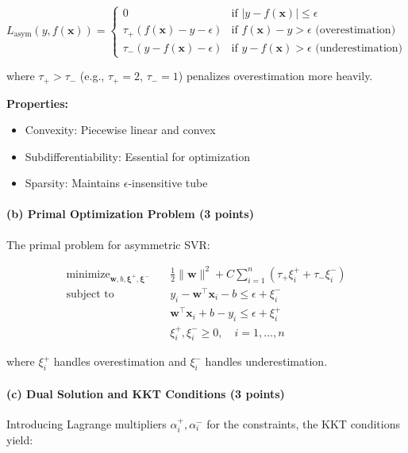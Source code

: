 \documentclass[12pt,a4paper]{article}
\DeclareMathOperator*{\minimize}{minimize}
\theoremstyle{definition}
\begin{document}
\begin{equation}
\boxed{L_{\text{asym}}(y, f(\mathbf{x})) = \begin{cases}
0 & \text{if } |y - f(\mathbf{x})| \leq \epsilon \\
\tau_+ (f(\mathbf{x}) - y - \epsilon) & \text{if } f(\mathbf{x}) - y > \epsilon \text{ (overestimation)}\\
\tau_- (y - f(\mathbf{x}) - \epsilon) & \text{if } y - f(\mathbf{x}) > \epsilon \text{ (underestimation)}
\end{cases}}
\end{equation}

where $\tau_+ > \tau_-$ (e.g., $\tau_+ = 2$, $\tau_- = 1$) penalizes overestimation more heavily.

\textbf{Properties:}
\begin{itemize}
\item Convexity: Piecewise linear and convex
\item Subdifferentiability: Essential for optimization
\item Sparsity: Maintains $\epsilon$-insensitive tube
\end{itemize}

\paragraph{(b) Primal Optimization Problem (3 points)}

The primal problem for asymmetric SVR:

\begin{align}
\minimize_{\mathbf{w}, b, \bm{\xi}^+, \bm{\xi}^-} \quad &\frac{1}{2}\|\mathbf{w}\|^2 + C\sum_{i=1}^n (\tau_+ \xi_i^+ + \tau_- \xi_i^-)\\
\text{subject to} \quad &y_i - \mathbf{w}^\top\mathbf{x}_i - b \leq \epsilon + \xi_i^-\\
&\mathbf{w}^\top\mathbf{x}_i + b - y_i \leq \epsilon + \xi_i^+\\
&\xi_i^+, \xi_i^- \geq 0, \quad i = 1,\ldots,n
\end{align}

where $\xi_i^+$ handles overestimation and $\xi_i^-$ handles underestimation.

\paragraph{(c) Dual Solution and KKT Conditions (3 points)}

Introducing Lagrange multipliers $\alpha_i^+, \alpha_i^-$ for the constraints, the KKT conditions yield:
\end{document}
